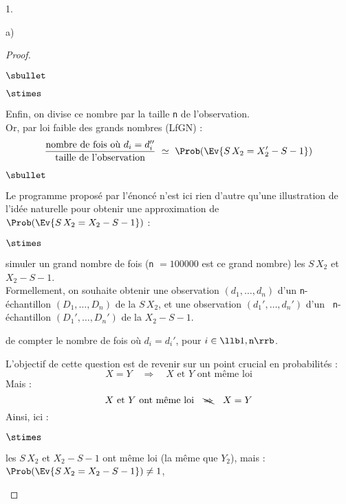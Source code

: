 \documentclass[11pt]{article}%
\begin{document}
\begin{noliste}{1.}
\begin{noliste}{a)}
\begin{proof}
\begin{noliste}{$\sbullet$}
\begin{noliste}{$\stimes$}
          
        \item Enfin, on divise ce nombre par la taille {\tt n} de
          l'observation.\\
          Or, par loi faible des grands nombres (LfGN) :
          \[
            \dfrac{\text{nombre de fois où $d_i = d_i''$}}{\text{taille
                de l'observation}} \ \simeq \ \Prob(\Ev{S \, X_2 = X_2'
              - S-1})
          \]
        \end{noliste}
      \end{noliste}
      \begin{remarkL}{.95}
        \begin{noliste}{$\sbullet$}
        \item Le programme proposé par l'énoncé n'est ici rien d'autre
          qu'une illustration de l'idée naturelle pour obtenir une
          approximation de $\Prob(\Ev{S \, X_2 = X_2 - S-1})$ :
          \begin{noliste}{$\stimes$}
          \item simuler un grand nombre de fois ({\tt n} $= 100000$
            est ce grand nombre) les \var $S \, X_2$ et $X_2 - S-1$.\\
            Formellement, on souhaite obtenir une observation $(d_1,
            \ldots, d_n)$ d'un {\tt n}-échantillon
            $(D_1, \ldots, D_n)$ de la \var $S \, X_2$, et une
            observation $(d_1', \ldots, d_n')$ d'un {\tt
              n}-échantillon $(D_1', \ldots, D_n')$ de la \var $X_2 -S-1$. 
            
          \item de compter le nombre de fois où $d_i = d_i'$, pour $i
            \in \llb 1, {\tt n} \rrb$.
          \end{noliste}
          
        \item L'objectif de cette question \Scilab{} est de revenir sur
          un point crucial en probabilités :
          \[
            X = Y \quad \Rightarrow \quad \text{$X$ et $Y$ ont
            même loi}
          \]
          Mais :
          \[
            \text{$X$ et $Y$ ont même loi} \quad \bcancel{\Rightarrow}
            \quad X=Y
          \]
          Ainsi, ici :
          \begin{noliste}{$\stimes$}
          \item les \var $S \, X_2$ et $X_2 -S-1$ ont même loi (la même
            que $Y_2$), mais : $\Prob(\Ev{S \, X_2 = X_2 -S-1}) \neq 1$,
            

\end{noliste}
\end{noliste}
\end{remarkL}
\end{proof}
\end{noliste}
\end{noliste}
\end{document}
